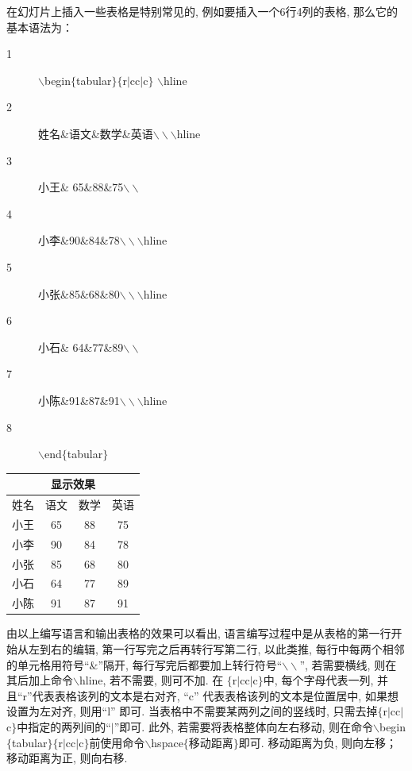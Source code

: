 在幻灯片上插入一些表格是特别常见的, 例如要插入一个6行4列的表格, 那么它的基本语法为：

\begin{minipage}{.5\textwidth}
\begin{description}
  \item[1]$\backslash$begin$\{$tabular$\}\{$r$|$cc$|$c$\}$ $\backslash$hline
  \item[2]姓名{}\&{}语文{}\&{}数学{}\&{}英语$\backslash\backslash$\hspace{5pt}$\backslash$hline
 \item[3] 小王\& 65\&88\&75$\backslash\backslash$
 \item[4] 小李\&90\&84\&78$\backslash\backslash$\hspace{5pt}$\backslash$hline
 \item[5] 小张\&85\&68\&80$\backslash\backslash$\hspace{5pt}$\backslash$hline
 \item[6] 小石\& 64\&77\&89$\backslash\backslash$
 \item[7] 小陈\&91\&87\&91$\backslash\backslash$\hspace{5pt}$\backslash$hline
 \item[8]$\backslash$end$\{$tabular$\}$
\end{description}
\end{minipage}
\begin{minipage}{.39\textwidth}
    \parskip=-5pt \renewcommand\arraystretch{.8}
 \begin{tabular}{r|cc|c}
 \multicolumn{4}{c}{显示效果}\\[10pt]
 \hline
 姓名&语文&数学&英语\\\hline
 小王&65&88&75\\
 小李&90&84&78\\\hline
 小张&85&68&80\\\hline
 小石&64&77&89\\
 小陈&91&87&91\\\hline
 \end{tabular}
 \end{minipage}
\medskip\smallskip

由以上编写语言和输出表格的效果可以看出, 语言编写过程中是从表格的第一行开始从左到右的编辑, 第一行写完之后再转行写第二行, 以此类推, 每行中每两个相邻的单元格用符号“$\&$”隔开, 每行写完后都要加上转行符号“$\backslash\backslash$”, 若需要横线, 则在其后加上命令$\backslash$hline, 若不需要, 则可不加. 在
$\{$r$|$cc$|$c$\}$中, 每个字母代表一列, 并且“r”代表表格该列的文本是右对齐, “c” 代表表格该列的文本是位置居中, 如果想设置为左对齐, 则用“l” 即可. 当表格中不需要某两列之间的竖线时, 只需去掉$\{$r$|$cc$|$c$\}$中指定的两列间的“$|$”即可. 此外, 若需要将表格整体向左右移动, 则在命令$\backslash$begin$\{$tabular$\}\{$r$|$cc$|$c$\}$前使用命令$\backslash$hspace$\{$移动距离$\}$即可. 移动距离为负, 则向左移；移动距离为正, 则向右移.


